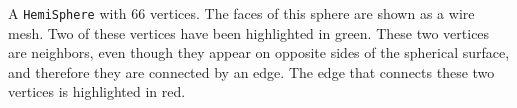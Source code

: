 \label{fig:hemiSphere} A \verb|HemiSphere| with 66 vertices. The faces of this sphere are shown as a wire mesh. Two of these vertices have been highlighted in green. These two vertices are neighbors, even though they appear on opposite sides of the spherical surface, and therefore they are connected by an edge. The edge that connects these two vertices is highlighted in red.